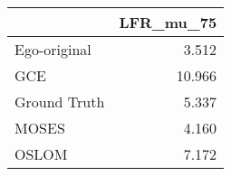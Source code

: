 \begin{tabular}{lr}
\toprule
{} & LFR_mu_75 \\
\midrule
Ego-original &     3.512 \\
GCE          &    10.966 \\
Ground Truth &     5.337 \\
MOSES        &     4.160 \\
OSLOM        &     7.172 \\
\bottomrule
\end{tabular}
